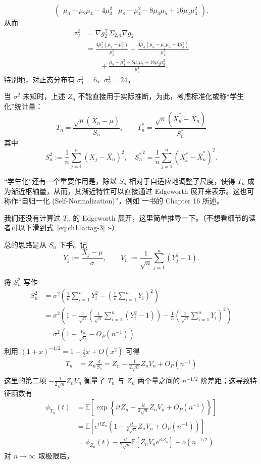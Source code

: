 \begin{corollary*}
\begin{itemize}
\[\begin{pmatrix}
  \mu_6-\mu_2\mu_4-4\mu_3^2 &
  \mu_8-\mu_4^2-8\mu_3\mu_5+16\mu_2\mu_3^2
  \end{pmatrix}.
  \]
  从而
  \[
  \begin{aligned}
  \sigma_2^2
  &=\nabla g_2^{\top}\Sigma_{2,4}\nabla g_2\\
  &=\frac{4\mu_4^2(\mu_4-\mu_2^2)}{\mu_2^6}
   -\frac{4\mu_4(\mu_6-\mu_2\mu_4-4\mu_3^2)}{\mu_2^5}\\
  &\qquad
   +\frac{\mu_8-\mu_4^2-8\mu_3\mu_5+16\mu_2\mu_3^2}{\mu_2^4}.
  \end{aligned}
  \]
  特别地，对正态分布有 $\sigma_1^2=6$、$\sigma_2^2=24$。
\end{itemize}
\end{corollary*}

当 $\sigma^2$ 未知时，上述 $Z_n$ 不能直接用于实际推断，为此，考虑标准化或称``学生化''统计量：
\[T_n=\frac{\sqrt{n}(\bar{X}_n-\mu)}{S_n},\qquad T_n^*=\frac{\sqrt{n}(\bar{X}_n^*-\bar{X}_n)}{S_n^*}\]
其中
\[
S^2_n:=\frac1n\sum_{j=1}^n(X_j-\bar X_n)^2,\quad {S_n^*}^2= \frac1n\sum_{j=1}^n(X_j^*-\bar{X}_n^*)^2.
\]

``学生化''还有一个重要作用是，除以 $S_n$ 相对于自适应地调整了尺度，使得 $T_n$ 成为渐近枢轴量，从而，其渐近特性可以直接通过 Edgeworth 展开来表示。这也可称作``自归一化 (Self-Normalization)''，例如 \cite{delapena2009} 一书的 Chapter 16 所述。

我们还没有计算过 $T_n$ 的 Edgeworth 展开，这里简单推导一下。（不想看细节的读者可以下滑到式~\eqref{eq:ch11a:tag-3} :-）

总的思路是从 $S_n$ 下手。记
\[
Y_j:=\frac{X_j-\mu}{\sigma},\qquad V_n:=\frac1{\sqrt n}\sum_{j=1}^n(Y_j^2-1).
\]

将 $S_n^2$ 写作
\[\begin{aligned} S_n^2 &=\sigma^2\left(\frac1n\sum_{i=1}^n Y_i^2-\left(\frac1n\sum_{i=1}^n Y_i\right)^2\right) \\ &=\sigma^2\left(1+\frac{1}{\sqrt n}\left(\frac1{\sqrt n}\sum_{i=1}^n(Y_i^2-1)\right)-\frac1n\left(\frac1{\sqrt n}\sum_{i=1}^n Y_i\right)^2\right) \\ &=\sigma^2\left(1+\frac{V_n}{\sqrt n}-O_P(n^{-1})\right) \\  \end{aligned}\]
利用 $(1+x)^{-1/2}=1-\frac12 x+O(x^2)$ 可得
\[\begin{aligned} T_n&=Z_n\frac{\sigma}{S_n}=Z_n-\frac{1}{2\sqrt n}Z_nV_n+O_P(n^{-1})\\  \end{aligned}\]
这里的第二项 $-\frac1{2\sqrt n}Z_nV_n$ 衡量了 $T_n$ 与 $Z_n$ 两个量之间的 $n^{-1/2}$ 阶差距；这导致特征函数有
\[\begin{aligned} \phi_{T_n}(t)&=\mathbb E\left[\exp\left\{it Z_n-\frac{it}{2\sqrt n}Z_nV_n+O_P(n^{-1})\right\}\right]\\ &=\mathbb E\left[e^{itZ_n}\left(1-\frac{it}{2\sqrt n}Z_nV_n+O_P(n^{-1})\right)\right]\\ &=\phi_{Z_n}(t)-\frac{it}{2\sqrt n}\mathbb E[Z_nV_n e^{itZ_n}]+o(n^{-1/2}) \end{aligned}\]
对 $n\to\infty$ 取极限后，

